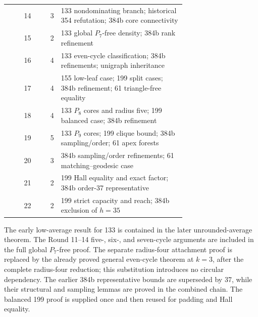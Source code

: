 \documentclass[11pt,a4paper]{article}
\theoremstyle{definition}\newtheorem{definition}[theorem]{Definition}
\theoremstyle{remark}\newtheorem{remark}[theorem]{Remark}
\begin{document}
\begin{longtable}{rrp{0.70\linewidth}}
14&3&133 nondominating branch; historical 354 refutation; 384b core connectivity\\[3pt]

15&2&133 global $P_7$-free density; 384b rank refinement\\[3pt]

16&4&133 even-cycle classification; 384b refinements; unigraph inheritance\\[3pt]

17&4&155 low-leaf case; 199 split cases; 384b refinement; 61 triangle-free equality\\[3pt]

18&4&133 $P_8$ cores and radius five; 199 balanced case; 384b refinement\\[3pt]

19&5&133 $P_9$ cores; 199 clique bound; 384b sampling/order; 61 apex forests\\[3pt]

20&3&384b sampling/order refinements; 61 matching--geodesic case\\[3pt]

21&2&199 Hall equality and exact factor; 384b order-37 representative\\[3pt]

22&2&199 strict capacity and reach; 384b exclusion of $h=35$\\[3pt]

\bottomrule
\end{longtable}
The early low-average result for 133 is contained in the later
unrounded-average theorem. The Round 11--14 five-, six-, and seven-cycle
arguments are included in the full global $P_7$-free proof. The separate
radius-four attachment proof is replaced by the already proved general
even-cycle theorem at $k=3$, after the complete radius-four reduction;
this substitution introduces no circular dependency. The earlier 384b
representative bounds are superseded by 37, while their structural and
sampling lemmas are proved in the combined chain. The balanced 199 proof
is supplied once and then reused for padding and Hall equality.
\end{document}
